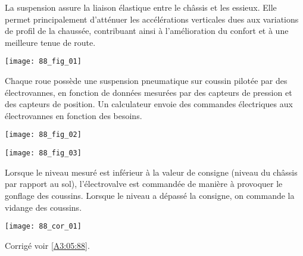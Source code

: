\normaltrue \difficilefalse \tdifficilefalse
\correctionfalse

\setcounter{question}{0}
\ifcorrection
\else
{}
\fi



\ifprof
\else
La suspension assure la liaison élastique entre le châssis et les essieux. Elle permet principalement d’atténuer les accélérations verticales dues aux variations de profil de la chaussée, contribuant ainsi à l’amélioration du confort et à une meilleure tenue de route.

\begin{center}
\texttt{[image: 88\_fig\_01]}
\end{center}

Chaque roue possède une suspension pneumatique sur coussin pilotée par des électrovannes, en fonction de données mesurées par des capteurs de pression et des capteurs de position. Un calculateur envoie des commandes électriques aux électrovannes en fonction des besoins.

\begin{center}
\texttt{[image: 88\_fig\_02]}
\end{center}


\begin{center}
\texttt{[image: 88\_fig\_03]}
\end{center}

Lorsque le niveau mesuré est inférieur à la valeur de consigne (niveau du châssis par rapport au sol), l’électrovalve est commandée de manière à provoquer le gonflage des coussins.
Lorsque le niveau a dépassé la consigne, on commande la vidange des coussins.

\fi
{}
\ifprof
\begin{corrige}
\begin{center}
\texttt{[image: 88\_cor\_01]}
\end{center}
\end{corrige}
\else
\fi







\ifprof
\else
\begin{flushright}
\footnotesize{Corrigé  voir \ref{A3:05:88}.}
\end{flushright}%
\fi